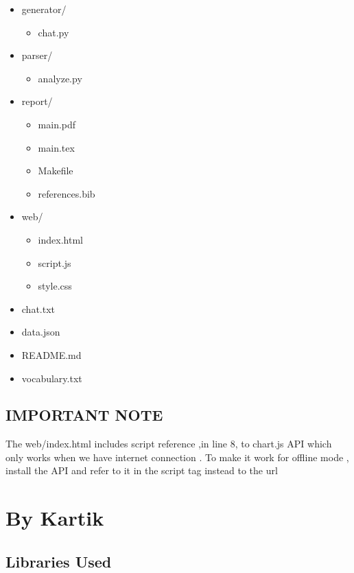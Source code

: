 \documentclass{report}
\begin{document}
\begin{itemize}
    \item generator/
    \begin{itemize}
        \item chat.py
    \end{itemize}
    
    \item parser/
    \begin{itemize}
        \item analyze.py
    \end{itemize}
    
    \item report/
    \begin{itemize}
        \item main.pdf
        \item main.tex
        \item Makefile
        \item references.bib
    \end{itemize}
    
    \item web/
    \begin{itemize}
        \item index.html
        \item script.js
        \item style.css
    \end{itemize}
    
    \item chat.txt
    \item data.json
    \item README.md
    \item vocabulary.txt
\end{itemize}

\section{IMPORTANT NOTE}
The web/index.html includes script reference ,in line 8, to chart.js API which only works when we have internet connection . To make it work for offline mode , install the API and refer to it in the script tag instead to the url

\chapter{By Kartik}

\section{Libraries Used}
\end{document}

